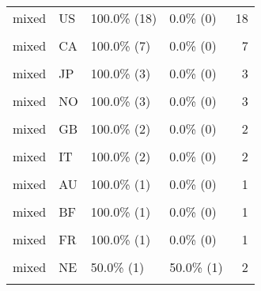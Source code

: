 \documentclass[
]{article}
\begin{document}
\begin{longtable}[t]{llllr}
\addlinespace
mixed & US & 100.0\%  (18) & 0.0\%  (0) & 18\\
\cellcolor{gray!6}{mixed} & \cellcolor{gray!6}{CN} & \cellcolor{gray!6}{100.0\%  (11)} & \cellcolor{gray!6}{0.0\%  (0)} & \cellcolor{gray!6}{11}\\
mixed & CA & 100.0\%   (7) & 0.0\%  (0) & 7\\
\cellcolor{gray!6}{mixed} & \cellcolor{gray!6}{MX} & \cellcolor{gray!6}{83.3\%   (5)} & \cellcolor{gray!6}{16.7\%  (1)} & \cellcolor{gray!6}{6}\\
mixed & JP & 100.0\%   (3) & 0.0\%  (0) & 3\\
\addlinespace
\cellcolor{gray!6}{mixed} & \cellcolor{gray!6}{NL} & \cellcolor{gray!6}{100.0\%   (3)} & \cellcolor{gray!6}{0.0\%  (0)} & \cellcolor{gray!6}{3}\\
mixed & NO & 100.0\%   (3) & 0.0\%  (0) & 3\\
\cellcolor{gray!6}{mixed} & \cellcolor{gray!6}{BR} & \cellcolor{gray!6}{100.0\%   (2)} & \cellcolor{gray!6}{0.0\%  (0)} & \cellcolor{gray!6}{2}\\
mixed & GB & 100.0\%   (2) & 0.0\%  (0) & 2\\
\cellcolor{gray!6}{mixed} & \cellcolor{gray!6}{IL} & \cellcolor{gray!6}{100.0\%   (2)} & \cellcolor{gray!6}{0.0\%  (0)} & \cellcolor{gray!6}{2}\\
\addlinespace
mixed & IT & 100.0\%   (2) & 0.0\%  (0) & 2\\
\cellcolor{gray!6}{mixed} & \cellcolor{gray!6}{LR} & \cellcolor{gray!6}{20.0\%   (1)} & \cellcolor{gray!6}{80.0\%  (4)} & \cellcolor{gray!6}{5}\\
mixed & AU & 100.0\%   (1) & 0.0\%  (0) & 1\\
\cellcolor{gray!6}{mixed} & \cellcolor{gray!6}{BE} & \cellcolor{gray!6}{100.0\%   (1)} & \cellcolor{gray!6}{0.0\%  (0)} & \cellcolor{gray!6}{1}\\
mixed & BF & 100.0\%   (1) & 0.0\%  (0) & 1\\
\addlinespace
\cellcolor{gray!6}{mixed} & \cellcolor{gray!6}{DK} & \cellcolor{gray!6}{100.0\%   (1)} & \cellcolor{gray!6}{0.0\%  (0)} & \cellcolor{gray!6}{1}\\
mixed & FR & 100.0\%   (1) & 0.0\%  (0) & 1\\
\cellcolor{gray!6}{mixed} & \cellcolor{gray!6}{IS} & \cellcolor{gray!6}{100.0\%   (1)} & \cellcolor{gray!6}{0.0\%  (0)} & \cellcolor{gray!6}{1}\\
mixed & NE & 50.0\%   (1) & 50.0\%  (1) & 2\\
\cellcolor{gray!6}{mixed} & \cellcolor{gray!6}{SG} & \cellcolor{gray!6}{100.0\%   (1)} & \cellcolor{gray!6}{0.0\%  (0)} & \cellcolor{gray!6}{1}\\

\end{longtable}
\end{document}
